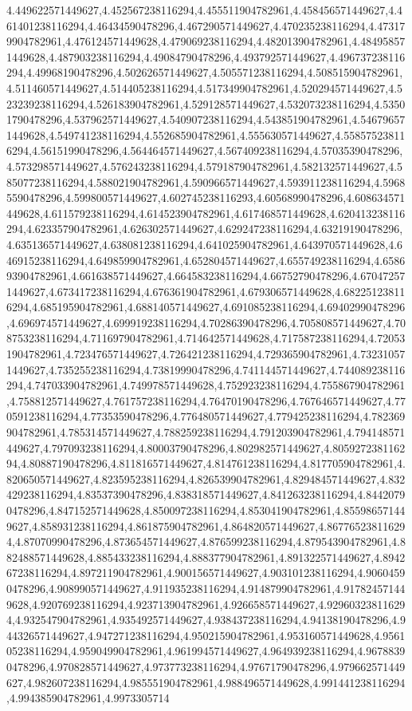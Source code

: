 4.449622571449627,4.452567238116294,4.455511904782961,4.458456571449627,4.461401238116294,4.46434590478296,4.467290571449627,4.470235238116294,4.473179904782961,4.476124571449628,4.479069238116294,4.482013904782961,4.484958571449628,4.487903238116294,4.49084790478296,4.493792571449627,4.496737238116294,4.49968190478296,4.502626571449627,4.505571238116294,4.508515904782961,4.511460571449627,4.514405238116294,4.517349904782961,4.520294571449627,4.523239238116294,4.526183904782961,4.529128571449627,4.532073238116294,4.53501790478296,4.537962571449627,4.540907238116294,4.543851904782961,4.546796571449628,4.549741238116294,4.552685904782961,4.555630571449627,4.558575238116294,4.56151990478296,4.564464571449627,4.567409238116294,4.57035390478296,4.573298571449627,4.576243238116294,4.579187904782961,4.582132571449627,4.585077238116294,4.588021904782961,4.590966571449627,4.593911238116294,4.59685590478296,4.599800571449627,4.602745238116293,4.60568990478296,4.608634571449628,4.611579238116294,4.614523904782961,4.617468571449628,4.620413238116294,4.623357904782961,4.626302571449627,4.629247238116294,4.63219190478296,4.635136571449627,4.638081238116294,4.641025904782961,4.643970571449628,4.646915238116294,4.649859904782961,4.652804571449627,4.655749238116294,4.658693904782961,4.661638571449627,4.664583238116294,4.66752790478296,4.670472571449627,4.673417238116294,4.676361904782961,4.679306571449628,4.682251238116294,4.685195904782961,4.688140571449627,4.691085238116294,4.69402990478296,4.696974571449627,4.699919238116294,4.70286390478296,4.705808571449627,4.708753238116294,4.711697904782961,4.714642571449628,4.717587238116294,4.720531904782961,4.723476571449627,4.726421238116294,4.729365904782961,4.732310571449627,4.735255238116294,4.73819990478296,4.741144571449627,4.744089238116294,4.747033904782961,4.749978571449628,4.752923238116294,4.755867904782961,4.758812571449627,4.761757238116294,4.76470190478296,4.767646571449627,4.770591238116294,4.77353590478296,4.776480571449627,4.779425238116294,4.782369904782961,4.785314571449627,4.788259238116294,4.791203904782961,4.794148571449627,4.797093238116294,4.80003790478296,4.802982571449627,4.805927238116294,4.80887190478296,4.811816571449627,4.814761238116294,4.817705904782961,4.820650571449627,4.823595238116294,4.826539904782961,4.829484571449627,4.832429238116294,4.83537390478296,4.838318571449627,4.841263238116294,4.84420790478296,4.847152571449628,4.850097238116294,4.853041904782961,4.855986571449627,4.858931238116294,4.861875904782961,4.864820571449627,4.867765238116294,4.87070990478296,4.873654571449627,4.876599238116294,4.879543904782961,4.882488571449628,4.885433238116294,4.888377904782961,4.891322571449627,4.894267238116294,4.897211904782961,4.900156571449627,4.903101238116294,4.90604590478296,4.908990571449627,4.911935238116294,4.914879904782961,4.917824571449628,4.920769238116294,4.923713904782961,4.926658571449627,4.929603238116294,4.932547904782961,4.935492571449627,4.938437238116294,4.94138190478296,4.944326571449627,4.947271238116294,4.950215904782961,4.953160571449628,4.956105238116294,4.959049904782961,4.961994571449627,4.964939238116294,4.96788390478296,4.970828571449627,4.973773238116294,4.97671790478296,4.979662571449627,4.982607238116294,4.985551904782961,4.988496571449628,4.991441238116294,4.994385904782961,4.9973305714
